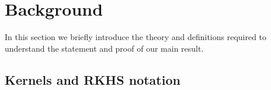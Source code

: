 \documentclass[]{article}
\begin{document}
%
%
%

\section{Background} 

In this section we briefly introduce the theory and definitions required to understand the statement and proof of our main result.

\subsection{Kernels and RKHS notation}

\end{document}
